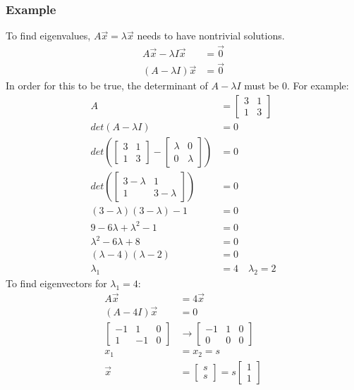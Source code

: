 \documentclass{math}
\begin{document}
\subsubsection*{Example}
To find eigenvalues, \( A\vec{x} = \lambda\vec{x} \) needs to have nontrivial
solutions.
\begin{align*}
  A\vec{x}-\lambda I\vec{x} &= \vec{0} \\
  (A-\lambda I)\vec{x} &= \vec{0}
\end{align*}
In order for this to be true, the determinant of \( A-\lambda I \) must be 0.
For example:
\begin{align*}
  A &= \begin{bmatrix}
    3 & 1 \\
    1 & 3
  \end{bmatrix} \\
  det(A-\lambda I) &= 0 \\
  det\left(\begin{bmatrix}
    3 & 1 \\
    1 & 3
  \end{bmatrix}-\begin{bmatrix}
    \lambda & 0 \\
    0 & \lambda
  \end{bmatrix}\right) &= 0 \\
  det\left(\begin{bmatrix}
    3-\lambda & 1 \\
    1 & 3-\lambda
  \end{bmatrix}\right) &= 0 \\
  (3-\lambda)(3-\lambda)-1 &= 0 \\
  9-6\lambda+\lambda^2-1 &= 0 \\
  \lambda^2-6\lambda+8 &= 0 \\
  (\lambda-4)(\lambda-2) &= 0 \\
  \lambda_1 &= 4 \quad \lambda_2 = 2
\end{align*}
To find eigenvectors for \( \lambda_1 = 4 \):
\begin{align*}
  A\vec{x} &= 4\vec{x} \\
  (A-4I)\vec{x} &= 0 \\
  \begin{bmatrix}
    -1 & 1 & 0 \\
    1 & -1 & 0
  \end{bmatrix} &\to \begin{bmatrix}
    -1 & 1 & 0 \\
    0 & 0 & 0
  \end{bmatrix} \\
  x_1 &= x_2 = s \\
  \vec{x} &= \begin{bmatrix}s \\ s\end{bmatrix} =
    s\begin{bmatrix}1 \\ 1\end{bmatrix}
\end{align*}
\end{document}

